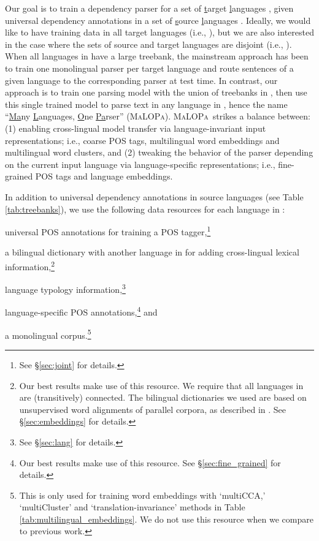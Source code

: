 \documentclass[11pt]{article}
\newcommand{\malopa}{\textsc{MaLOPa}}
\newenvironment{itemizesquish}{\begin{list}{\labelitemi}{\setlength{\itemsep}{0em}\setlength{\labelwidth}{0.5em}\setlength{\leftmargin}{\labelwidth}\addtolength{\leftmargin}{\labelsep}}}{\end{list}}
\begin{document}
Our goal is to train a dependency parser for a set of \underline{t}arget \underline{l}anguages , given universal dependency annotations in a set of \underline{s}ource \underline{l}anguages .
Ideally, we would like to have training data in all target languages (i.e., ), but we are also interested in the case where the sets of source and target languages are disjoint (i.e., ).
When all languages in  have a large treebank, the mainstream approach has been to train one monolingual parser per target language and route sentences of a given language to the corresponding parser at test time.
In contrast, our approach is to train one parsing model with the union of treebanks in , then use this single trained model to parse text in any language in , hence the name ``\underline{Ma}ny \underline{L}anguages, \underline{O}ne \underline{Pa}rser'' (\malopa).
\malopa~strikes a balance between:
(1) enabling cross-lingual model transfer via language-invariant input representations; i.e., coarse POS tags, multilingual word embeddings and multilingual word clusters, and
(2) tweaking the behavior of the parser depending on the current input language via language-specific representations; i.e., fine-grained POS tags and language embeddings.

In addition to universal dependency annotations in source languages (see Table \ref{tab:treebanks}), we use the following data resources for each language in :
\begin{itemizesquish}
\item universal POS annotations for training a POS tagger,\footnote{See \S\ref{sec:joint} for details.}
\item a bilingual dictionary with another language in  for adding cross-lingual lexical information,\footnote{Our best results make use of this resource. We require that all languages in  are (transitively) connected. The bilingual dictionaries we used are based on unsupervised word alignments of parallel corpora, as described in . See \S\ref{sec:embeddings} for details.}
\item language typology information,\footnote{See \S\ref{sec:lang} for details.}
\item language-specific POS annotations,\footnote{Our best results make use of this resource. See \S\ref{sec:fine_grained} for details.} and
\item a monolingual corpus.\footnote{This is only used for training word embeddings with `multiCCA,' `multiCluster' and `translation-invariance' methods in Table \ref{tab:multilingual_embeddings}. We do not use this resource when we compare to previous work.}
\end{itemizesquish}
\end{document}
